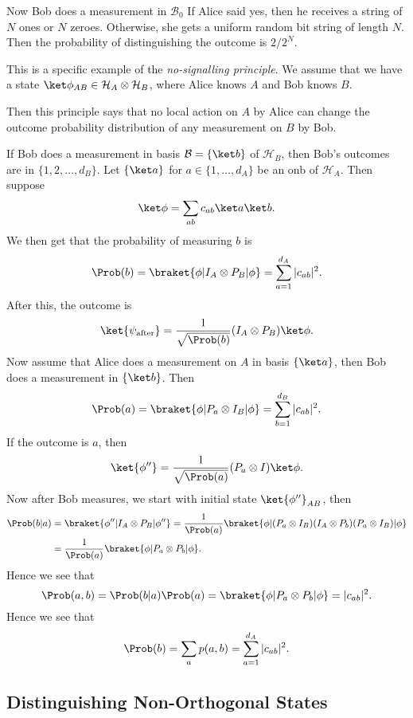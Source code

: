 \documentclass[12pt]{article}
\begin{document}
Now Bob does a measurement in $\mathcal{B}_0$ If Alice said yes, then he receives a string of $N$ ones or $N$ zeroes. Otherwise, she gets a uniform random bit string of length $N$. Then the probability of distinguishing the outcome is $2/2^N$.

This is a specific example of the \emph{no-signalling principle}. We assume that we have a state $\ket \phi_{AB} \in \mathcal{H}_A \otimes \mathcal{H}_B$, where Alice knows $A$ and Bob knows $B$.

Then this principle says that no local action on $A$ by Alice can change the outcome probability distribution of any measurement on $B$ by Bob.

\begin{proofbox}
	If Bob does a measurement in basis $\mathcal{B} = \{ \ket b\}$ of $\mathcal{H}_B$, then Bob's outcomes are in $\{1, 2, \ldots, d_B\}$. Let $\{\ket a\}$ for $a \in \{1, \ldots, d_A\}$ be an onb of $\mathcal{H}_A$. Then suppose
	\[
	\ket \phi = \sum_{ab} c_{ab} \ket a \ket b.
	\]
	We then get that the probability of measuring $b$ is
	\[
		\Prob(b) = \braket{\phi|I_A \otimes P_B | \phi} = \sum_{a = 1}^{d_A} |c_{ab}|^2.
	\]
	After this, the outcome is
	\[
		\ket{\psi_{\mathrm{after}}} = \frac{1}{\sqrt{\Prob(b)}}(I_A \otimes P_B) \ket \phi.
	\]
	Now assume that Alice does a measurement on $A$ in basis $\{\ket a\}$, then Bob does a measurement in $\{\ket b\}$. Then
	\[
		\Prob(a) = \braket{\phi|P_a \otimes I_B|\phi} = \sum_{b = 1}^{d_B}|c_{ab}|^2.
	\]
	If the outcome is $a$, then
	\[
		\ket{\phi''} = \frac{1}{\sqrt{\Prob(a)}} (P_a \otimes I) \ket \phi.
	\]
	Now after Bob measures, we start with initial state $\ket{\phi''}_{AB}$, then
	\begin{align*}
		\Prob(b|a) &= \braket{\phi''|I_A \otimes P_B|\phi''} = \frac{1}{\Prob(a)} \braket{\phi|(P_a \otimes I_B)(I_A \otimes P_b)(P_a \otimes I_B)|\phi} \\
			   &= \frac{1}{\Prob(a)} \braket{\phi|P_a \otimes P_b|\phi}.
	\end{align*}
	Hence we see that
	\[
		\Prob(a, b) = \Prob(b|a) \Prob(a) = \braket{\phi|P_a \otimes P_b|\phi} = |c_{ab}|^2.
	\]
	Hence we see that
	\[
	\Prob(b) = \sum_a p(a, b) = \sum_{a = 1}^{d_A} |c_{ab}|^2.
	\]
\end{proofbox}

\subsection{Distinguishing Non-Orthogonal States}
\label{sub:dist_stat}
\end{document}
